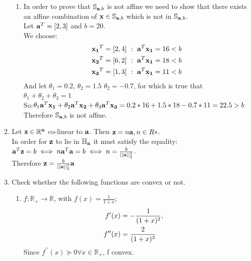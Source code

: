 \documentclass[12pt]{article}
\begin{document}
\begin{enumerate}
\begin{enumerate}
\item 
In order to prove that $\mathbb{S}_{{\bf a},b}$ is not affine we need to show that there exists an affine combination of ${\bf x}\in  \mathbb{S}_{{\bf a},b}$ which is not in  $\mathbb{S}_{{\bf a},b}$.\\
Let ${\bf a}^T=[2,3]$ and $b=20$.\\
We choose:
\begin{equation}
	\begin{split}
		&{\bf x_1}^T=[2,4]\ :\ {\bf a}^T{\bf x_1}=16<b\\
		&{\bf x_2}^T=[6,2]\ :\ {\bf a}^T{\bf x_1}=18<b\\
		&{\bf x_3}^T=[1,3]\ :\ {\bf a}^T{\bf x_1}=11<b\\
	\end{split}
\end{equation}
And let $\theta_1=0.2$, $\theta_2=1.5$ $\theta_2=-0.7$, for which is true that $\theta_1+\theta_2+\theta_3=1$\\
So:$\theta_1{\bf a}^T{\bf x_1}+\theta_2{\bf a}^T{\bf x_2}+\theta_3{\bf a}^T{\bf x_3} = 0.2*16+1.5*18-0.7*11=22.5>b$\\
Therefore $\mathbb{S}_{{\bf a},b}$ is not affine.

\end{enumerate}


\item
Let ${\bf z\in \mathbb{R}^n}$ co-linear to ${\bf a}$. Then ${\bf z}=n{\bf a},n\in R*$.\\
In order for ${\bf z}$ to lie in $\mathbb{H}_{\bf a}$ it must satisfy the equality:\\
${\bf a}^T{\bf z}=b \iff n{\bf a}^T{\bf a}=b \iff n=\frac{b}{||{\bf a}||_2^2}$.\\
Therefore ${\bf z}=\frac{b}{||{\bf a}||_2^2}{\bf a}$

\item 
Check whether the following functions are convex or not.
\begin{enumerate}
\item
$f:\mathbb{R}_{+}\rightarrow \mathbb{R}$, with $f(x)=\frac{1}{1+x}$;\\
\begin{equation}
	\begin{split}
		f^{\prime}(x) &= -\frac{1}{(1+x)^2}, \cr
		f^{\prime\prime}(x) &= \frac{2}{(1+x)^3} \cr
	\end{split} 
\end{equation}
Since $f^{\prime\prime}(x)\succcurlyeq0 \forall x\in \mathbb{R}_{+}$, f convex.


\end{enumerate}
\end{enumerate}
\end{document}
